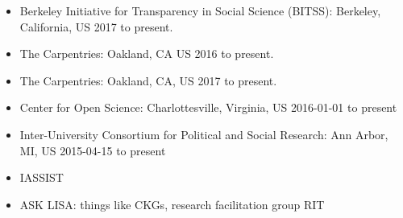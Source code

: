 \begin{itemize}
\item Berkeley Initiative for Transparency in Social Science (BITSS): Berkeley, California, US 2017 to present. 
\item The Carpentries: Oakland, CA US 2016 to present.
\item The Carpentries: Oakland, CA, US  2017 to present.
\item Center for Open Science: Charlottesville, Virginia, US 2016-01-01 to present
\item Inter-University Consortium for Political and Social Research: Ann Arbor, MI, US 2015-04-15 to present 
\item IASSIST 
\item ASK LISA: things like CKGs, research facilitation group RIT
\end{itemize}